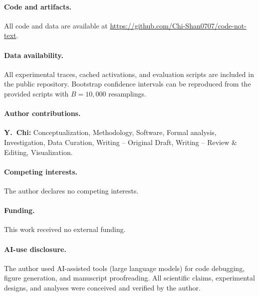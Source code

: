 \documentclass[10pt,twocolumn]{article}
\begin{document}
\paragraph{Code and artifacts.}
All code and data are available at \url{https://github.com/Chi-Shan0707/code-not-text}.

\paragraph{Data availability.}
All experimental traces, cached activations, and evaluation scripts are included in the public repository. Bootstrap confidence intervals can be reproduced from the provided scripts with $B=10{,}000$ resamplings.

\paragraph{Author contributions.}
\textbf{Y.\ Chi:} Conceptualization, Methodology, Software, Formal analysis, Investigation, Data Curation, Writing -- Original Draft, Writing -- Review \& Editing, Visualization.

\paragraph{Competing interests.}
The author declares no competing interests.

\paragraph{Funding.}
This work received no external funding.

\paragraph{AI-use disclosure.}
The author used AI-assisted tools (large language models) for code debugging, figure generation, and manuscript proofreading. All scientific claims, experimental designs, and analyses were conceived and verified by the author.
\end{document}
